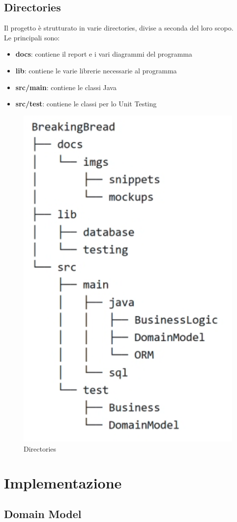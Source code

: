 \documentclass{article}
\begin{document}
\newpage

\subsection{Directories}
Il progetto è strutturato in varie directories, divise a seconda del loro scopo. \\
Le principali sono:
\begin{itemize}
    \item {\textbf{docs}}: contiene il report e i vari diagrammi del programma
    \item {\textbf{lib}}: contiene le varie librerie necessarie al programma
    \item {\textbf{src/main}}: contiene le classi Java
    \item {\textbf{src/test}}: contiene le classi per lo Unit Testing
\end{itemize}

\begin{figure}[!h]
    \includegraphics[width=0.5\linewidth]{imgs/Directories.png}
    \centering
    \caption{Directories}
    \label{Directories}
\end{figure}

\clearpage

\section{Implementazione}

\subsection{Domain Model}
\end{document}
